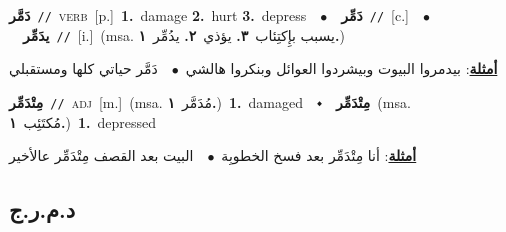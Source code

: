\documentclass[10pt,a4paper,twoside]{article} %
\begin{document}
\begin{multicols}{2}
{\setlength\topsep{0pt}\textbf{\foreignlanguage{arabic}{دَمَّر}}\ {\color{gray}\texttt{//}\color{black}}\ \textsc{verb}\ [p.]\ \textbf{1.}~damage  \textbf{2.}~hurt  \textbf{3.}~depress\ \ $\bullet$\ \ \setlength\topsep{0pt}\textbf{\foreignlanguage{arabic}{دَمِّر}}\ {\color{gray}\texttt{//}\color{black}}\ [c.]\ \ $\bullet$\ \ \setlength\topsep{0pt}\textbf{\foreignlanguage{arabic}{يدَمِّر}}\ {\color{gray}\texttt{//}\color{black}}\ [i.]\ \color{gray}(msa. \foreignlanguage{arabic}{يسبب بإِكتِئاب}~\foreignlanguage{arabic}{\textbf{٣.}}  \foreignlanguage{arabic}{يؤذي}~\foreignlanguage{arabic}{\textbf{٢.}}  \foreignlanguage{arabic}{يدُمِّر}~\foreignlanguage{arabic}{\textbf{١.}})\color{black}\  \begin{flushright}\color{gray}\foreignlanguage{arabic}{\textbf{\underline{\foreignlanguage{arabic}{أمثلة}}}: بيدمروا البيوت وبيشردوا العوائل وبنكروا هالشي\ $\bullet$\ \  دَمَّر حياتي كلها ومستقبلي}\end{flushright}\color{black}} \vspace{2mm}

{\setlength\topsep{0pt}\textbf{\foreignlanguage{arabic}{مِتْدَمِّر}}\ {\color{gray}\texttt{//}\color{black}}\ \textsc{adj}\ [m.]\ \color{gray}(msa. \foreignlanguage{arabic}{مُدَمَّر}~\foreignlanguage{arabic}{\textbf{١.}})\color{black}\ \textbf{1.}~damaged\ \ $\smblkdiamond$\ \ \setlength\topsep{0pt}\textbf{\foreignlanguage{arabic}{مِتْدَمِّر}}\ \color{gray}(msa. \foreignlanguage{arabic}{مُكتَئِب}~\foreignlanguage{arabic}{\textbf{١.}})\color{black}\ \textbf{1.}~depressed\  \begin{flushright}\color{gray}\foreignlanguage{arabic}{\textbf{\underline{\foreignlanguage{arabic}{أمثلة}}}: أنا مِتْدَمِّر بعد فسخ الخطوبِة\ $\bullet$\ \  البيت بعد القصف مِتْدَمِّر عالأخير}\end{flushright}\color{black}} \vspace{2mm}

\vspace{-3mm}
\subsection*{\color{blue}\foreignlanguage{arabic}{د.م.ر.ج}\color{blue}{ (ntws)}} 


\end{multicols}
\end{document}
